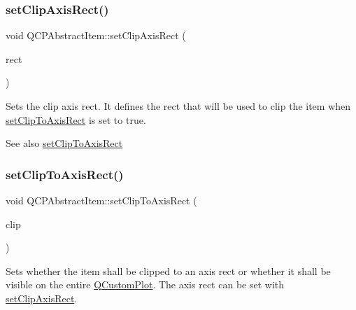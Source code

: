 \mbox{\label{class_q_c_p_abstract_item_a7dc75fcbcd10206fe0b75d757ea7a347}} 
\subsubsection{\texorpdfstring{set\+Clip\+Axis\+Rect()}{setClipAxisRect()}}
{\footnotesize\ttfamily void Q\+C\+P\+Abstract\+Item\+::set\+Clip\+Axis\+Rect (\begin{DoxyParamCaption}\item[{\hyperlink{class_q_c_p_axis_rect}{Q\+C\+P\+Axis\+Rect} $\ast$}]{rect }\end{DoxyParamCaption})}

Sets the clip axis rect. It defines the rect that will be used to clip the item when \hyperlink{class_q_c_p_abstract_item_a39e05b9d4176b9accafc746d16ca6a06}{set\+Clip\+To\+Axis\+Rect} is set to true.

\begin{DoxySeeAlso}{See also}
\hyperlink{class_q_c_p_abstract_item_a39e05b9d4176b9accafc746d16ca6a06}{set\+Clip\+To\+Axis\+Rect} 
\end{DoxySeeAlso}
\mbox{\label{class_q_c_p_abstract_item_a39e05b9d4176b9accafc746d16ca6a06}} 
\subsubsection{\texorpdfstring{set\+Clip\+To\+Axis\+Rect()}{setClipToAxisRect()}}
{\footnotesize\ttfamily void Q\+C\+P\+Abstract\+Item\+::set\+Clip\+To\+Axis\+Rect (\begin{DoxyParamCaption}\item[{bool}]{clip }\end{DoxyParamCaption})}

Sets whether the item shall be clipped to an axis rect or whether it shall be visible on the entire \hyperlink{class_q_custom_plot}{Q\+Custom\+Plot}. The axis rect can be set with \hyperlink{class_q_c_p_abstract_item_a7dc75fcbcd10206fe0b75d757ea7a347}{set\+Clip\+Axis\+Rect}.

